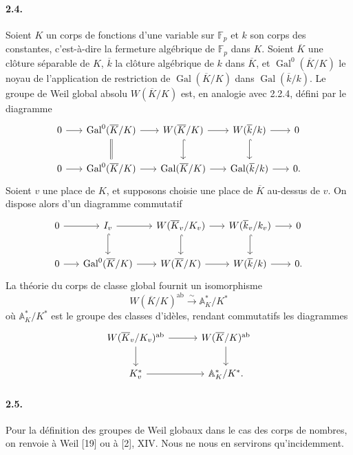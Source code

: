 \documentclass[10pt]{article}
\newcommand{\F}{\mathbb F}
\newcommand{\A}{\mathbb A}
\newcommand{\Gal}{\operatorname{Gal}}
\newcommand{\iso}{\xrightarrow{\sim}}
\providecommand{\ab}{\mathrm{ab}}
\providecommand{\ab}{\mathrm{ab}}
\begin{document}
\paragraph{2.4.} Soient \(K\) un corps de fonctions d'une variable sur \(\F_p\) et \(k\) son corps des constantes, c'est-à-dire la fermeture algébrique de \(\F_p\) dans \(K\). Soient \(\overline K\) une clôture séparable de \(K\), \(\overline k\) la clôture algébrique de \(k\) dans \(\overline K\), et \(\Gal^0(\overline K/K)\) le noyau de l'application de restriction de \(\Gal(\overline K/K)\) dans \(\Gal(\overline k/k)\). Le groupe de Weil global absolu \(W(\overline K/K)\) est, en analogie avec 2.2.4, défini par le diagramme
\[
\begin{tikzcd}[column sep=1.7em,row sep=2.1em]
0 \arrow[r] & \Gal^0(\overline K/K) \arrow[r] \arrow[d,equal] &
W(\overline K/K) \arrow[r] \arrow[d,hook] &
W(\overline k/k) \arrow[r] \arrow[d,hook] & 0\\
0 \arrow[r] & \Gal^0(\overline K/K) \arrow[r] &
\Gal(\overline K/K) \arrow[r] &
\Gal(\overline k/k) \arrow[r] & 0 .
\end{tikzcd}
\]
Soient \(v\) une place de \(K\), et supposons choisie une place de \(\overline K\) au-dessus de \(v\). On dispose alors d'un diagramme commutatif
\[
\begin{tikzcd}[column sep=1.6em,row sep=2.1em]
0 \arrow[r] & I_v \arrow[r] \arrow[d,hook] &
W(\overline K_v/K_v) \arrow[r] \arrow[d,hook] &
W(\overline k_v/k_v) \arrow[r] \arrow[d,hook] & 0\\
0 \arrow[r] & \Gal^0(\overline K/K) \arrow[r] &
W(\overline K/K) \arrow[r] &
W(\overline k/k) \arrow[r] & 0 .
\end{tikzcd}
\]
La théorie du corps de classe global fournit un isomorphisme
\[
W(\overline K/K)^{\ab}\iso\A_K^*/K^*
\]
où \(\A_K^*/K^*\) est le groupe des classes d'idèles, rendant commutatifs les diagrammes
\[
\begin{tikzcd}[column sep=3.0em,row sep=2.0em]
W(\overline K_v/K_v)^{\ab} \arrow[r] \arrow[d] &
W(\overline K/K)^{\ab} \arrow[d]\\
K_v^* \arrow[r] & \A_K^*/K^* .
\end{tikzcd}
\]

\paragraph{2.5.} Pour la définition des groupes de Weil globaux dans le cas des corps de nombres, on renvoie à Weil [19] ou à [2], XIV. Nous ne nous en servirons qu'incidemment.
\end{document}
